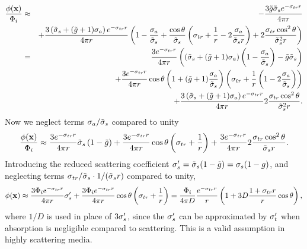 \documentclass[10pt,a4paper]{article}
\begin{document}
\begin{eqnarray*}
    \frac{\phi(\mathbf{x})}{\Phi_i} &\approx& - \frac{3 \tilde{g} \tilde{\sigma}_s e^{- \sigma_{tr} r}}{4\pi r}
      \\
     && + \frac{3 \left(\tilde{\sigma}_s + (\tilde{g} +1) \sigma_a \right) e^{-\sigma_{tr} r} }{4\pi r}
  \left(1 -
    \frac{\sigma_a}{\tilde{\sigma}_s} + \frac{\cos \theta}{\tilde{\sigma}_s} \left(
    \sigma_{tr} + \frac{1}{r} - 2 \frac{\sigma_a}{\tilde{\sigma}_s r} \right) + 2
    \frac{\sigma_{tr} \cos^2\theta}{\tilde{\sigma}_s^2 r} \right) \\
    &=& \frac{3 e^{- \sigma_{tr} r}}{4\pi r} \left( \left(\tilde{\sigma}_s +
    (\tilde{g} +1) \sigma_a \right)  \left( 1 - \frac{\sigma_a}{\tilde{\sigma}_s}
    \right) - \tilde{g} \tilde{\sigma}_s  \right) \\
    && + \frac{3 e^{- \sigma_{tr} r}}{4\pi r} \cos \theta  \left(1 +
    (\tilde{g} +1) \frac{\sigma_a}{\tilde{\sigma}_s} \right) \left( \sigma_{tr} +
    \frac{1}{r}\left(1 - 2\frac{\sigma_a}{\tilde{\sigma}_s}\right) \right) \\
    && + \frac{3 \left(\tilde{\sigma}_s + (\tilde{g} +1) \sigma_a \right) e^{-\sigma_{tr} r} }{4\pi r}
 2 \frac{\sigma_{tr} \cos^2\theta}{\tilde{\sigma}_s^2 r} .
\end{eqnarray*}
Now we neglect terms $\sigma_a/\tilde{\sigma}_s$ compared to unity
\begin{equation*}
   \frac{\phi(\mathbf{x})}{\Phi_i} \approx  \frac{3 e^{- \sigma_{tr} r}}{4\pi r} \tilde{\sigma}_s
    \left( 1 - \tilde{g} \right)
    + \frac{3 e^{- \sigma_{tr} r}}{4\pi r} \cos \theta \left( \sigma_{tr} + \frac{1}{r} \right)
    + \frac{3 e^{-\sigma_{tr} r} }{4\pi r} 2 \frac{\sigma_{tr}
    \cos^2\theta}{\tilde{\sigma}_s r}.
\end{equation*}
Introducing the reduced scattering coefficient ${\sigma}'_s = \tilde{\sigma}_s ( 1 - \tilde{g}) = \sigma_s ( 1 - g)$, and neglecting terms $\sigma_{tr}/\tilde{\sigma}_s \cdot 1/(\tilde{\sigma}_s r)$ compared to unity,
\begin{equation*}
    \phi(\mathbf{x}) \approx  \frac{3 \Phi_i e^{- \sigma_{tr} r}}{4\pi r} {\sigma}'_s
    + \frac{3 \Phi_i e^{- \sigma_{tr} r}}{4\pi r} \cos \theta \left( \sigma_{tr} +
    \frac{1}{r} \right) = \frac{\Phi_i}{4\pi D} \frac{e^{- \sigma_{tr} r}}{ r} \left( 1
    + 3 D \frac{1 + \sigma_{tr} r}{r} \cos \theta \right),
\end{equation*}
where $1/D$ is used in place of $3{\sigma}'_s$, since the ${\sigma}'_s$ can be approximated by ${\sigma}'_t$ when absorption is negligible compared to scattering. This is a valid assumption in highly scattering media.
\end{document}
